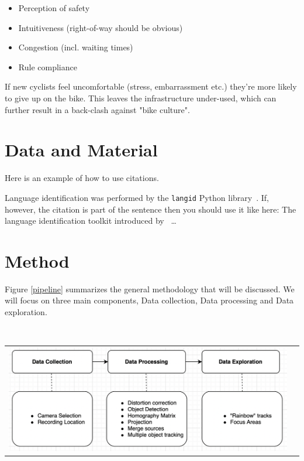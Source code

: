 \documentclass[
10pt, %
a4paper, %
oneside, %
headinclude,footinclude, %
] {book}%
\begin{document}
\begin{itemize}
	\item Perception of safety
	\item Intuitiveness (right-of-way should be obvious)
	\item Congestion (incl. waiting times)
	\item Rule compliance
\end{itemize}

If new cyclists feel uncomfortable (stress, embarrassment etc.) they're more likely to give up on the bike. This leaves the infrastructure 
under-used, which can further result in a back-clash against "bike culture".

\chapter{Data and Material}
\label{datagathering}

Here is an example of how to use citations.

Language identification was performed by the \texttt{langid} Python library~\citep{langid}. If, however, the citation is part of the sentence then you should use it like here: The language identification toolkit introduced by~\cite{langid}
\ldots

\chapter{Method}

Figure \ref{pipeline} summarizes the general methodology that will be discussed. We will focus
on three main components, Data collection, Data processing and Data exploration.

\ \\ 
\noindent
\begin{tabular}{@{}cc}
\includegraphics[width=1.0\columnwidth]{temp.png} 
\end{tabular}
\label{pipeline}
\end{document}
